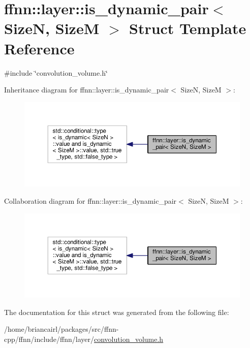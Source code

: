 \hypertarget{structffnn_1_1layer_1_1is__dynamic__pair}{\section{ffnn\-:\-:layer\-:\-:is\-\_\-dynamic\-\_\-pair$<$ Size\-N, Size\-M $>$ Struct Template Reference}
\label{structffnn_1_1layer_1_1is__dynamic__pair}
}


{\ttfamily \#include \char`\"{}convolution\-\_\-volume.\-h\char`\"{}}



Inheritance diagram for ffnn\-:\-:layer\-:\-:is\-\_\-dynamic\-\_\-pair$<$ Size\-N, Size\-M $>$\-:
\nopagebreak
\begin{figure}[H]
\begin{center}
\leavevmode
\includegraphics[width=350pt]{structffnn_1_1layer_1_1is__dynamic__pair__inherit__graph}
\end{center}
\end{figure}


Collaboration diagram for ffnn\-:\-:layer\-:\-:is\-\_\-dynamic\-\_\-pair$<$ Size\-N, Size\-M $>$\-:
\nopagebreak
\begin{figure}[H]
\begin{center}
\leavevmode
\includegraphics[width=350pt]{structffnn_1_1layer_1_1is__dynamic__pair__coll__graph}
\end{center}
\end{figure}


The documentation for this struct was generated from the following file\-:\begin{DoxyCompactItemize}
\item 
/home/briancairl/packages/src/ffnn-\/cpp/ffnn/include/ffnn/layer/\hyperlink{convolution__volume_8h}{convolution\-\_\-volume.\-h}\end{DoxyCompactItemize}

